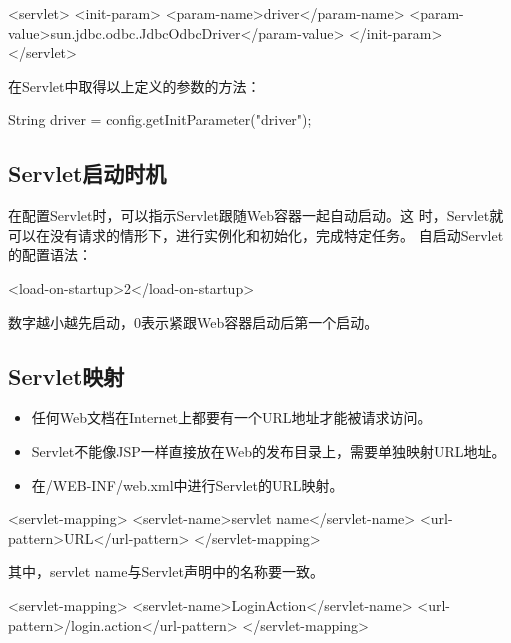\begin{xmlCode}
  <servlet>
    <init-param>
      <param-name>driver</param-name>
      <param-value>sun.jdbc.odbc.JdbcOdbcDriver</param-value>
    </init-param>
  </servlet>
\end{xmlCode}

在Servlet中取得以上定义的参数的方法：

\begin{javaCode}
  String driver = config.getInitParameter("driver");
\end{javaCode}

\subsection{Servlet启动时机}

在配置Servlet时，可以指示Servlet跟随Web容器一起自动启动。这
时，Servlet就可以在没有请求的情形下，进行实例化和初始化，完成特定任务。
自启动Servlet的配置语法：

\begin{xmlCode}
  <load-on-startup>2</load-on-startup>
\end{xmlCode}

数字越小越先启动，0表示紧跟Web容器启动后第一个启动。


\subsection{Servlet映射}

\begin{itemize}
\item 任何Web文档在Internet上都要有一个URL地址才能被请求访问。
\item Servlet不能像JSP一样直接放在Web的发布目录上，需要单独映射URL地址。
\item 在{\Red /WEB-INF/web.xml}中进行Servlet的URL映射。
\end{itemize}


\begin{xmlCode}
  <servlet-mapping>
    <servlet-name>servlet name</servlet-name>
    <url-pattern>URL</url-pattern>
  </servlet-mapping>
\end{xmlCode}

{\kai 其中，servlet name与Servlet声明中的名称要一致。}


\begin{xmlCode}
  <servlet-mapping>
    <servlet-name>LoginAction</servlet-name>
    <url-pattern>/login.action</url-pattern>
  </servlet-mapping>
\end{xmlCode}

